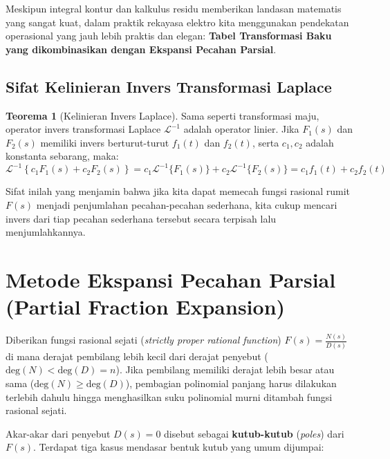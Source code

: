 \documentclass[11pt,a4paper]{article}
\theoremstyle{definition}
\newtheorem{theorem}{Teorema}[section]
\begin{document}
Meskipun integral kontur dan kalkulus residu memberikan landasan matematis yang sangat kuat, dalam praktik rekayasa elektro kita menggunakan pendekatan operasional yang jauh lebih praktis dan elegan: \textbf{Tabel Transformasi Baku yang dikombinasikan dengan Ekspansi Pecahan Parsial}.

\subsection{Sifat Kelinieran Invers Transformasi Laplace}

\begin{theorem}[Kelinieran Invers Laplace]
Sama seperti transformasi maju, operator invers transformasi Laplace $\mathcal{L}^{-1}$ adalah operator linier. Jika $F_1(s)$ dan $F_2(s)$ memiliki invers berturut-turut $f_1(t)$ dan $f_2(t)$, serta $c_1, c_2$ adalah konstanta sebarang, maka:
\begin{equation}
    \mathcal{L}^{-1}\left\{ c_1 F_1(s) + c_2 F_2(s) \right\} = c_1 \mathcal{L}^{-1}\{F_1(s)\} + c_2 \mathcal{L}^{-1}\{F_2(s)\} = c_1 f_1(t) + c_2 f_2(t)
    \label{eq:inverse_linearity}
\end{equation}
\end{theorem}

Sifat inilah yang menjamin bahwa jika kita dapat memecah fungsi rasional rumit $F(s)$ menjadi penjumlahan pecahan-pecahan sederhana, kita cukup mencari invers dari tiap pecahan sederhana tersebut secara terpisah lalu menjumlahkannya.

\section{Metode Ekspansi Pecahan Parsial (Partial Fraction Expansion)}

Diberikan fungsi rasional sejati (\textit{strictly proper rational function}) $F(s) = \frac{N(s)}{D(s)}$ di mana derajat pembilang lebih kecil dari derajat penyebut ($\text{deg}(N) < \text{deg}(D) = n$). Jika pembilang memiliki derajat lebih besar atau sama ($\text{deg}(N) \ge \text{deg}(D)$), pembagian polinomial panjang harus dilakukan terlebih dahulu hingga menghasilkan suku polinomial murni ditambah fungsi rasional sejati.

Akar-akar dari penyebut $D(s) = 0$ disebut sebagai \textbf{kutub-kutub} (\textit{poles}) dari $F(s)$. Terdapat tiga kasus mendasar bentuk kutub yang umum dijumpai:
\end{document}

